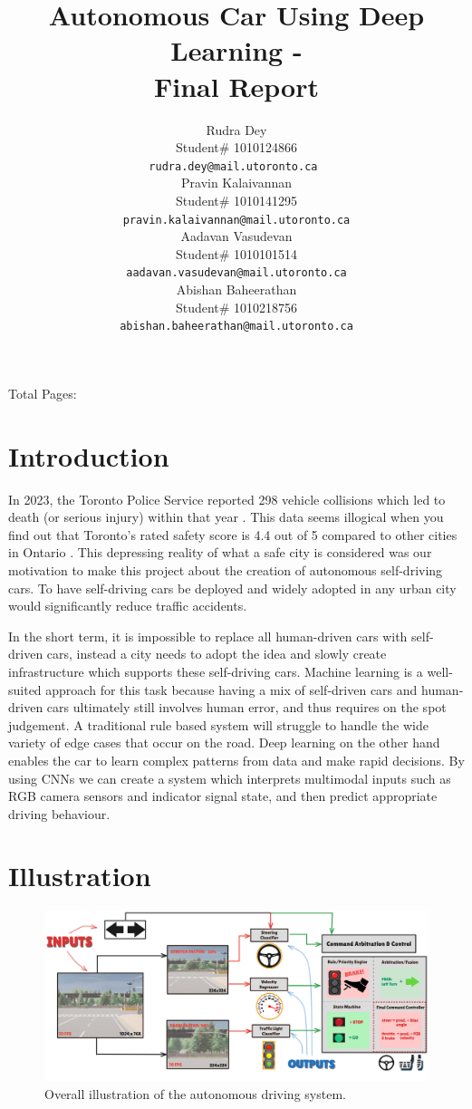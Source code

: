\documentclass{article} %
\title{Autonomous Car Using Deep Learning - \\Final Report}
\author{Rudra Dey  \\
Student\# 1010124866\\
\texttt{rudra.dey@mail.utoronto.ca } \\
\And
Pravin Kalaivannan  \\
Student\# 1010141295 \\
\texttt{pravin.kalaivannan@mail.utoronto.ca} \\
\AND
Aadavan Vasudevan  \\
Student\# 1010101514 \\
\texttt{aadavan.vasudevan@mail.utoronto.ca} \\
\And
Abishan Baheerathan \\
Student\# 1010218756 \\
\texttt{abishan.baheerathan@mail.utoronto.ca} \\
\AND
}
\begin{document}
\maketitle

Total Pages: \pageref{last_page}


\section{Introduction}

In 2023, the Toronto Police Service reported 298 vehicle collisions which led to death (or serious injury) within that year \citep{toronto-ksi}. This data seems illogical when 
you find out that Toronto’s rated safety score is 4.4 out of 5 compared to other cities in Ontario \citep{brokerlink2025ontario}. 
This depressing reality of what a safe city is considered was our motivation to make this project about the creation of autonomous self-driving cars. To have self-driving cars be deployed and widely adopted in any urban city would significantly reduce traffic accidents.  

In the short term, it is impossible to replace all human-driven cars with self-driven cars, instead a city needs to adopt the idea and slowly 
create infrastructure which supports these self-driving cars. Machine learning is a well-suited approach for this task because having a mix of 
self-driven cars and human-driven cars ultimately still involves human error, and thus requires on the spot judgement. A traditional rule based 
system will struggle to handle the wide variety of edge cases that occur on the road. Deep learning on the other hand enables the car to learn 
complex patterns from data and make rapid decisions. By using CNNs we can create a system which interprets multimodal inputs such as RGB camera 
sensors and indicator signal state, and then predict appropriate driving behaviour.

\section{Illustration}


\begin{figure}[H] %
    \centering
    \includegraphics[width=1.0\textwidth]{newPic.png} %
    \caption{Overall illustration of the autonomous driving system.}
    \label{fig:illustrationExample}
\end{figure}
\end{document}
